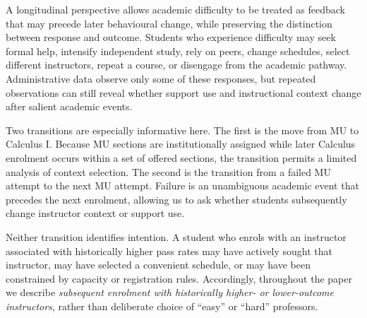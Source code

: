 A longitudinal perspective allows academic difficulty to be treated as feedback that may precede later behavioural change, while preserving the distinction between response and outcome. Students who experience difficulty may seek formal help, intensify independent study, rely on peers, change schedules, select different instructors, repeat a course, or disengage from the academic pathway. Administrative data observe only some of these responses, but repeated observations can still reveal whether support use and instructional context change after salient academic events.

Two transitions are especially informative here. The first is the move from MU to Calculus I. Because MU sections are institutionally assigned while later Calculus enrolment occurs within a set of offered sections, the transition permits a limited analysis of context selection. The second is the transition from a failed MU attempt to the next MU attempt. Failure is an unambiguous academic event that precedes the next enrolment, allowing us to ask whether students subsequently change instructor context or support use.

Neither transition identifies intention. A student who enrols with an instructor associated with historically higher pass rates may have actively sought that instructor, may have selected a convenient schedule, or may have been constrained by capacity or registration rules. Accordingly, throughout the paper we describe \emph{subsequent enrolment with historically higher- or lower-outcome instructors}, rather than deliberate choice of ``easy'' or ``hard'' professors.

